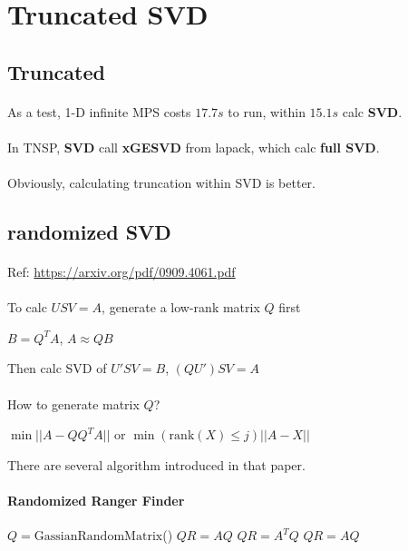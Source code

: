 \documentclass{article}
\begin{document}
\section{Truncated SVD}

\subsection{Truncated}
\paragraph{}
As a test, 1-D infinite MPS costs $17.7 s$ to run, within $15.1 s$ calc \textbf{SVD}.

\paragraph{}
In TNSP, \textbf{SVD} call \textbf{xGESVD} from lapack, which calc \textbf{full SVD}.

\paragraph{}
Obviously, calculating truncation within SVD is better.

\subsection{randomized SVD}
\paragraph{}
Ref: \url{https://arxiv.org/pdf/0909.4061.pdf}

\paragraph{}
To calc $U S V = A$, generate a low-rank matrix $Q$ first

$B = Q^T A$, $A \approx QB$

Then calc SVD of $U' S V = B$, $(QU') S V = A$

\paragraph{}
How to generate matrix $Q$?

$\min ||A - QQ^TA||$
or
$\min(\mathrm{rank}(X) \le j) ||A-X||$

There are several algorithm introduced in that paper.

\paragraph{Randomized Ranger Finder}
\begin{algorithmic}
    \STATE $Q = \mathrm{GassianRandomMatrix}$()
    \LOOP
        \STATE $Q R = A Q$
        \STATE $Q R = A^T Q$
    \ENDLOOP
    \STATE $Q R = A Q$
\end{algorithmic}
\end{document}
